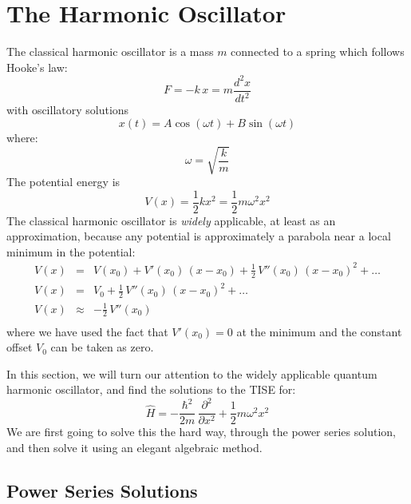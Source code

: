 \documentclass[12pt]{book}
\begin{document}
\section{The Harmonic Oscillator}

The classical harmonic oscillator is a mass $m$ connected to a spring which follows Hooke's law:
\begin{equation*}
F = -k \, x = m \frac{d^2x}{dt^2} 
\end{equation*}
with oscillatory solutions
\begin{equation*}
x(t) = A \cos(\omega t) + B \sin(\omega t)
\end{equation*}
where:
\begin{equation*}
\omega = \sqrt{\frac{k}{m}}
\end{equation*}
The potential energy is
\begin{equation*}
V(x) = \frac{1}{2}k x^2 = \frac{1}{2} m \omega^2 x^2
\end{equation*}
The classical harmonic oscillator is {\em widely} applicable, at least as an approximation, because any potential is approximately a parabola near a local minimum in the potential:
\begin{eqnarray*}
V(x) &=& V(x_0) + V'(x_0) \, (x-x_0) + \frac{1}{2}\,V''(x_0) \, (x-x_0)^2 + \ldots \\[5pt]
V(x) &=& V_0 + \frac{1}{2}\,V''(x_0) \, (x-x_0)^2 + \ldots \\[5pt]
V(x) &\approx& -\frac{1}{2}\,V''(x_0)\\
\end{eqnarray*}
where we have used the fact that $V'(x_0)=0$ at the minimum and the constant offset $V_0$ can be taken as zero.

In this section, we will turn our attention to the widely applicable quantum harmonic oscillator, and find the solutions to the TISE for:
\begin{equation*}
\hat{H} = -\frac{\hbar^2}{2m}\,\frac{\partial^2}{\partial x^2} + \frac{1}{2} m \omega^2 x^2
\end{equation*}
We are first going to solve this the hard way, through the power series solution, and then solve it using an elegant algebraic method.

\subsection{Power Series Solutions}
\end{document}
